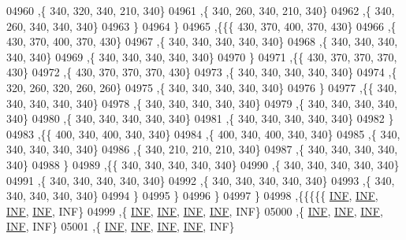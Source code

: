 \begin{DoxyCode}
04960     ,\{   340,   320,   340,   210,   340\}
04961     ,\{   340,   260,   340,   210,   340\}
04962     ,\{   340,   260,   340,   340,   340\}
04963     \}
04964    \}
04965   ,\{\{\{   430,   370,   400,   370,   430\}
04966     ,\{   430,   370,   400,   370,   430\}
04967     ,\{   340,   340,   340,   340,   340\}
04968     ,\{   340,   340,   340,   340,   340\}
04969     ,\{   340,   340,   340,   340,   340\}
04970     \}
04971    ,\{\{   430,   370,   370,   370,   430\}
04972     ,\{   430,   370,   370,   370,   430\}
04973     ,\{   340,   340,   340,   340,   340\}
04974     ,\{   320,   260,   320,   260,   260\}
04975     ,\{   340,   340,   340,   340,   340\}
04976     \}
04977    ,\{\{   340,   340,   340,   340,   340\}
04978     ,\{   340,   340,   340,   340,   340\}
04979     ,\{   340,   340,   340,   340,   340\}
04980     ,\{   340,   340,   340,   340,   340\}
04981     ,\{   340,   340,   340,   340,   340\}
04982     \}
04983    ,\{\{   400,   340,   400,   340,   340\}
04984     ,\{   400,   340,   400,   340,   340\}
04985     ,\{   340,   340,   340,   340,   340\}
04986     ,\{   340,   210,   210,   210,   340\}
04987     ,\{   340,   340,   340,   340,   340\}
04988     \}
04989    ,\{\{   340,   340,   340,   340,   340\}
04990     ,\{   340,   340,   340,   340,   340\}
04991     ,\{   340,   340,   340,   340,   340\}
04992     ,\{   340,   340,   340,   340,   340\}
04993     ,\{   340,   340,   340,   340,   340\}
04994     \}
04995    \}
04996   \}
04997  \}
04998 ,\{\{\{\{\{   \hyperlink{energy__const_8h_a12c2040f25d8e3a7b9e1c2024c618cb6}{INF},   \hyperlink{energy__const_8h_a12c2040f25d8e3a7b9e1c2024c618cb6}{INF},   \hyperlink{energy__const_8h_a12c2040f25d8e3a7b9e1c2024c618cb6}{INF},   \hyperlink{energy__const_8h_a12c2040f25d8e3a7b9e1c2024c618cb6}{INF},   INF\}
04999     ,\{   \hyperlink{energy__const_8h_a12c2040f25d8e3a7b9e1c2024c618cb6}{INF},   \hyperlink{energy__const_8h_a12c2040f25d8e3a7b9e1c2024c618cb6}{INF},   \hyperlink{energy__const_8h_a12c2040f25d8e3a7b9e1c2024c618cb6}{INF},   \hyperlink{energy__const_8h_a12c2040f25d8e3a7b9e1c2024c618cb6}{INF},   INF\}
05000     ,\{   \hyperlink{energy__const_8h_a12c2040f25d8e3a7b9e1c2024c618cb6}{INF},   \hyperlink{energy__const_8h_a12c2040f25d8e3a7b9e1c2024c618cb6}{INF},   \hyperlink{energy__const_8h_a12c2040f25d8e3a7b9e1c2024c618cb6}{INF},   \hyperlink{energy__const_8h_a12c2040f25d8e3a7b9e1c2024c618cb6}{INF},   INF\}
05001     ,\{   \hyperlink{energy__const_8h_a12c2040f25d8e3a7b9e1c2024c618cb6}{INF},   \hyperlink{energy__const_8h_a12c2040f25d8e3a7b9e1c2024c618cb6}{INF},   \hyperlink{energy__const_8h_a12c2040f25d8e3a7b9e1c2024c618cb6}{INF},   \hyperlink{energy__const_8h_a12c2040f25d8e3a7b9e1c2024c618cb6}{INF},   INF\}

\end{DoxyCode}
